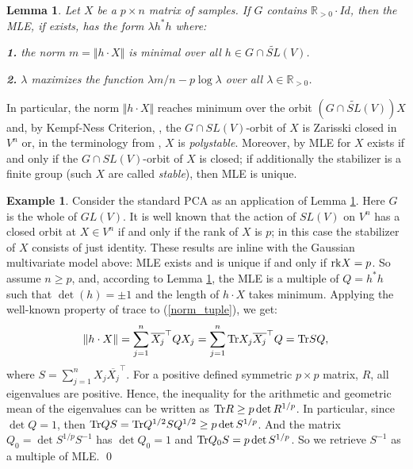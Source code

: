 \documentclass[reqno]{amsart}
\theoremstyle{plain}
\newtheorem{lemma}[theorem]{Lemma}
\theoremstyle{definition}
\newtheorem{example}[theorem]{Example}
\theoremstyle{remark}
\newcommand{\Rl}{\mathbb R}
\begin{document}
\begin{lemma}\label{main_am} \cite[Proposition~3.4]{am} Let $X$ be a $p\times n$ matrix of samples. If  $G$ contains ${\mathbb R}_{>0} \cdot Id$, then the MLE, if exists, has the form $\lambda h^*h$ where:

{\bf 1.}  the norm $m=\Vert h\cdot X\Vert$ is minimal over all $h\in G\cap \widetilde{SL}(V)$.

{\bf 2.} $\lambda$  maximizes the function $\lambda m/n - p\log \lambda$ over all $\lambda\in \Rl_{> 0}$.
\end{lemma}
In particular, the norm $\Vert h\cdot X\Vert$ reaches minimum over the orbit $(G\cap \widetilde{SL}(V))X$ and, by Kempf-Ness Criterion, \cite{kn}, the  $G\cap SL(V)$-orbit of $X$ is Zarisski  closed in $V^n$ or, in the terminology from \cite{am}, $X$ is {\it polystable}. Moreover, by \cite[Theorem~3.10]{am} MLE for $X$ exists if and only if the $G\cap SL(V)$-orbit of $X$ is closed; if additionally the stabilizer is a finite group (such $X$ are called {\it stable}), then MLE is unique.

\begin{example} Consider the standard PCA as an application of Lemma \ref{main_am}. Here $G$ is the whole of $GL(V)$. It is well known that the action of $SL(V)$ on $V^n$ has a closed orbit at $X\in V^n$ if and only if the rank of $X$ is $p$; in this case the stabilizer of $X$ consists of just identity. These results are inline with the Gaussian multivariate model above: MLE exists and is unique if and only if ${\rm rk} X=p$. So assume $n\geq p$, and, according to  Lemma \ref{main_am}, the MLE is a multiple of $Q=h^*h$ such that $\det(h)=\pm 1$ and the length of $h\cdot X$  takes minimum. Applying the well-known property of trace to (\ref{norm_tuple}), we get:
\begin{equation}\label{norm_as_trace}
\Vert h\cdot X\Vert = \sum_{j=1}^n \overline{X_j}^{\top} Q X_j= \sum_{j=1}^n {\rm Tr}X_j  \overline{X_j}^{\top}Q= {\rm Tr} SQ,
\end{equation}
where $S= \sum_{j=1}^n X_j  \overline{X_j}^{\top}.$ For a positive defined symmetric $p\times p$ matrix, $R$, all eigenvalues are positive. Hence, the inequality for the arithmetic and geometric mean of the eigenvalues can be written as ${\rm Tr}R\geq p  \det R^{1/p}$. In particular, since $\det Q=1$, then ${\rm Tr} QS={\rm Tr} Q^{1/2} S Q^{1/2}\geq p \det  S^{1/p}$. And the matrix $Q_0=\det S^{1/p} S^{-1}$ has $\det Q_0=1$ and ${\rm Tr} Q_0S= p \det  S^{1/p}$. So we retrieve $S^{-1}$ as a multiple of MLE. \qed
\end{example}
\end{document}
